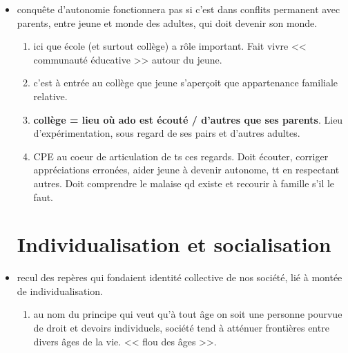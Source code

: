 \documentclass[12pt]{report}
\begin{document}
\begin{itemize}
\item conquête d'autonomie fonctionnera pas si c'est dans conflits permanent avec parents, entre jeune et monde des adultes, qui doit devenir son monde. \\
\begin{enumerate}
\item ici que école (et surtout collège) a rôle important. Fait vivre << communauté éducative >> autour du jeune. \\
\item c'est à entrée au collège que jeune s'aperçoit que appartenance familiale relative.\\
\item \textbf{collège = lieu où ado est écouté / d'autres que ses parents}. Lieu d'expérimentation, sous regard de ses pairs et d'autres adultes. \\
\item CPE au coeur de articulation de ts ces regards. Doit écouter, corriger appréciations erronées, aider jeune à devenir autonome, tt en respectant autres. Doit comprendre le malaise qd existe et recourir à famille s'il le faut.\\
\end{enumerate}


\section{Individualisation et socialisation}


\item recul des repères qui fondaient identité collective de nos société, lié à montée de individualisation.\\
\begin{enumerate}
\item au nom du principe qui veut qu'à tout âge on soit une personne pourvue de droit et devoirs individuels, société tend à atténuer frontières entre divers âges de la vie. << flou des âges >>. \\
\end{enumerate}


\end{itemize}
\end{document}
